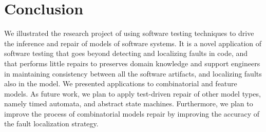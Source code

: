 \documentclass[
12pt, %
oneside, %
english, %
singlespacing, %
headsepline, %
consistentlayout, %
]{MastersDoctoralThesis} %
\theoremstyle{plain}
\theoremstyle{definition}
\theoremstyle{remark}
\theoremstyle{remark}
\theoremstyle{plain}
\theoremstyle{plain}
\theoremstyle{remark}
\begin{document}
\chapter{Conclusion}
We illustrated the research project of using software testing techniques to drive the inference and repair of models of software systems.
It is a novel application of software testing that goes beyond detecting and localizing faults in code, and that performs little repairs to preserves domain knowledge and support engineers in maintaining consistency between all the software artifacts, and localizing faults also in the model. 
We presented applications to combinatorial and feature models. As future work, we plan to apply test-driven repair of other model types, namely timed automata, and abstract state machines. Furthermore, we plan to improve the process of combinatorial models repair by improving the accuracy of the fault localization strategy.%


 




%
%
%





\end{document}
